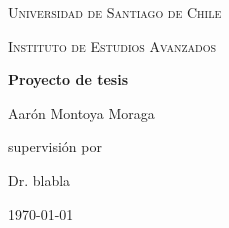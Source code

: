 \documentclass[10pt]{report}
\begin{document}
\begin{titlepage}
	\centering
	{\LARGE \textsc{Universidad de Santiago de Chile}\par}
	\vspace{1cm}
	{\Large \textsc{Instituto de Estudios Avanzados}\par}
	\vspace{1.5cm}
	{\huge\bfseries Proyecto de tesis\par}
	\vspace{2cm}
	{\Large Aarón Montoya Moraga\par}
	\vfill
	supervisión por \par
	Dr. blabla

	\vfill

	{\large \today\par}
\end{titlepage}

\newpage

\tableofcontents

\newpage




\newpage



\newpage




\newpage



\newpage



\newpage



\newpage



\newpage



\newpage



\newpage


\end{document}
